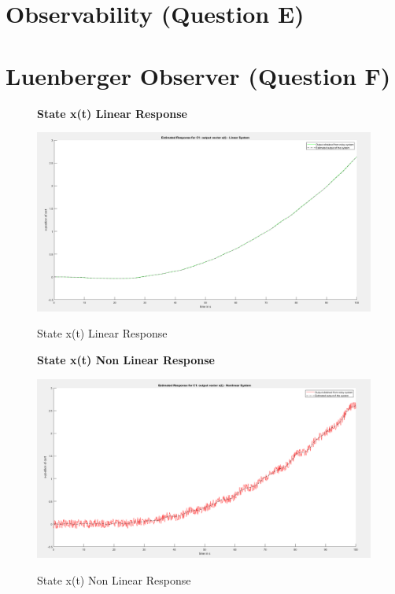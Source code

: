 \documentclass[12pt]{article}
\begin{document}
\section{Observability (Question E)}


\section{Luenberger Observer (Question F)}
\begin{figure}[H]
    \centering
    \textbf{State x(t) Linear Response}\par\medskip
    \includegraphics[scale = 0.35]{StateXlinearResponse.png}\\[0.0 cm]	%
    \caption{State x(t) Linear Response} 
\end{figure}

\begin{figure}[H]
    \centering
    \textbf{State x(t) Non Linear Response}\par\medskip
    \includegraphics[scale = 0.35]{StateXNonLinearResponse.png}\\[0.0 cm]	%
    \caption{State x(t) Non Linear Response} 
\end{figure}
\end{document}
